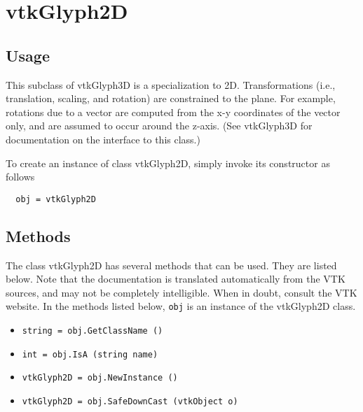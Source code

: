 \section{vtkGlyph2D}

\subsection{Usage}

 This subclass of vtkGlyph3D is a specialization to 2D. Transformations
 (i.e., translation, scaling, and rotation) are constrained to the plane.
 For example, rotations due to a vector are computed from the x-y
 coordinates of the vector only, and are assumed to occur around the
 z-axis. (See vtkGlyph3D for documentation on the interface to this
 class.)
 

To create an instance of class vtkGlyph2D, simply
invoke its constructor as follows
\begin{verbatim}
  obj = vtkGlyph2D
\end{verbatim}
\subsection{Methods}

The class vtkGlyph2D has several methods that can be used.
  They are listed below.
Note that the documentation is translated automatically from the VTK sources,
and may not be completely intelligible.  When in doubt, consult the VTK website.
In the methods listed below, \verb|obj| is an instance of the vtkGlyph2D class.
\begin{itemize}
\item  \verb|string = obj.GetClassName ()|

\item  \verb|int = obj.IsA (string name)|

\item  \verb|vtkGlyph2D = obj.NewInstance ()|

\item  \verb|vtkGlyph2D = obj.SafeDownCast (vtkObject o)|

\end{itemize}
